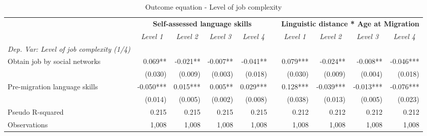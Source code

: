 \documentclass[12pt,a4paper]{article}
\begin{document}
\begin{landscape}

\begin{table}[htbp]
  \centering
  \caption{Outcome equation - Level of job complexity}
    \begin{tabular}{p{7.55em}rrrrrrrrr}
    \toprule
    \toprule
    \multicolumn{1}{r}{} & \multicolumn{4}{c}{\textbf{Self-assessed language skills}} &       & \multicolumn{4}{c}{\textbf{Linguistic distance * Age at Migration}} \\
\cmidrule{2-5}\cmidrule{7-10}    \multicolumn{1}{r}{} & \multicolumn{1}{c}{\textit{Level 1}} & \multicolumn{1}{c}{\textit{Level 2}} & \multicolumn{1}{c}{\textit{Level 3}} & \multicolumn{1}{c}{\textit{Level 4}} &       & \multicolumn{1}{c}{\textit{Level 1}} & \multicolumn{1}{c}{\textit{Level 2}} & \multicolumn{1}{c}{\textit{Level 3}} & \multicolumn{1}{c}{\textit{Level 4}} \\
    \midrule
    \multicolumn{1}{l}{\textit{Dep. Var: Level of job complexity (1/4)}} &       &       &       &       &       &       &       &       &  \\
    \multicolumn{1}{l}{Obtain job by social networks} & 0.069** & -0.021** & -0.007** & -0.041** &       &  0.079*** &  -0.024** &  -0.008** &  -0.046*** \\
    \multicolumn{1}{l}{                         } & (0.030) & (0.009) & (0.003) & (0.018) &       & (0.030) & (0.009) & (0.004) & (0.018) \\
    \multicolumn{1}{l}{Pre-migration language skills} & -0.050*** & 0.015*** & 0.005** & 0.029*** &       &  0.128*** &  -0.039*** &  -0.013*** &  -0.076*** \\
    \multicolumn{1}{l}{                         } & (0.014) & (0.005) & (0.002) & (0.008) &       & (0.038) & (0.013) & (0.005) & (0.023) \\
    \multicolumn{1}{l}{Pseudo R-squared} & 0.215 & 0.215 & 0.215 & 0.215 &       & 0.212 & 0.212 & 0.212 & 0.212 \\
    Observations &          1,008    &          1,008    &          1,008    &          1,008    &       &          1,008    &          1,008    &          1,008    &          1,008    \\
    \bottomrule
    \end{tabular}%



\end{table}
\end{landscape}
\end{document}
